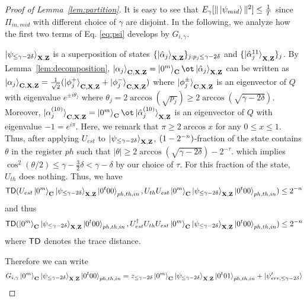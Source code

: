 \begin{proof}[Proof of Lemma~\ref{lem:partition}]
It is easy to see that $E_{\gamma}[\|\ket{\psi_{mid}}\|^2]\leq \frac{1}{T}$ since $\Pi_{in, mid}$ with different choice of $\gamma$ are disjoint. 
In the following, we analyze how the first two terms of Eq. \ref{eq:psi} develops by $G_{i,\gamma}$. 

$\ket{\psi_{\leq\gamma-2\delta}}_{\mathbf{X},\mathbf{Z}}$ is a superposition of states $\{\ket{\hat{\alpha}_j}_{\mathbf{X},\mathbf{Z}}\}_{j:p_j\leq \gamma-2\delta}$ and $\{\ket{\hat{\alpha}_j^{11}}_{\mathbf{X},\mathbf{Z}}\}_{j}$.
By Lemma~\ref{lem:decomposition}, $\ket{\alpha_j}_{\regC,\regX,\regZ}=\ket{0^m}_{\regC}\ot \ket{\hat{\alpha}_j}_{\regX,\regZ}$ can be written as $\ket{\alpha_j}_{\mathbf{C},\mathbf{X},\mathbf{Z}}=\frac{1}{\sqrt{2}}(\ket{\phi_j^+}_{\mathbf{C},\mathbf{X},\mathbf{Z}}+\ket{\phi_j^-}_{\mathbf{C},\mathbf{X},\mathbf{Z}})$ where $\ket{\phi_j^\pm}_{\mathbf{C},\mathbf{X},\mathbf{Z}}$ is an eigenvector of $Q$ with eigenvalue $e^{\pm i\theta_j}$ where $\theta_j=2\arccos(\sqrt{p_j})\geq 2\arccos (\sqrt{\gamma-2\delta})$. 
Moreover,  $\ket{\alpha_j^{(10)}}_{\regC,\regX,\regZ}=\ket{0^m}_{\regC}\ot \ket{\hat{\alpha}_j^{(10)}}_{\regX,\regZ}$ is an eigenvector of $Q$ with eigenvalue $-1=e^{i\pi}$. 
Here, we remark that $\pi\geq 2\arccos x$ for any $0\leq x \leq 1$.
Thus, after applying $U_{est}$ to  $\ket{\psi_{\leq\gamma-2\delta}}_{\mathbf{X},\mathbf{Z}}$, $(1-2^{-n})$-fraction of the state contains $\theta$ in the register $ph$ such that $|\theta|\geq 2\arccos(\sqrt{\gamma-2\delta}) -2^{-\tau}$. which implies $\cos^2(\theta/2)\leq \gamma-\frac{3}{2}\delta<\gamma-\delta$ by our choice of $\tau$.
For this fraction of the state, $U_{th}$ does nothing.
 Thus, we have 
 \begin{align*}
 \mathsf{TD}(U_{est}\ket{0^m}_{\mathbf{C}}\ket{\psi_{\leq\gamma-2\delta}}_{\mathbf{X},\mathbf{Z}}\ket{0^t00}_{ph,th,in},U_{th}U_{est}\ket{0^m}_{\mathbf{C}}\ket{\psi_{\leq\gamma-2\delta}}_{\mathbf{X},\mathbf{Z}}\ket{0^t00}_{ph,th,in})\leq 2^{-n}
 \end{align*}
  and thus
  \begin{align*}
  \mathsf{TD}(\ket{0^m}_{\mathbf{C}}\ket{\psi_{\leq\gamma-2\delta}}_{\mathbf{X},\mathbf{Z}}\ket{0^t00}_{ph,th,in},U_{est}^\dag U_{th}U_{est}\ket{0^m}_{\mathbf{C}}\ket{\psi_{\leq\gamma-2\delta}}_{\mathbf{X},\mathbf{Z}}\ket{0^t00}_{ph,th,in})\leq 2^{-n}
  \end{align*}
   where $\mathsf{TD}$ denotes the trace distance. 

Therefore we can write
\begin{align}
 G_{i,\gamma}\ket{0^m}_{\mathbf{C}}\ket{\psi_{\leq\gamma-2\delta}}_{\mathbf{X},\mathbf{Z}}\ket{0^t00}_{ph,th,in}=z_{\leq \gamma-2\delta}\ket{0^m}_{\mathbf{C}}\ket{\psi_{\leq\gamma-2\delta}}_{\mathbf{X},\mathbf{Z}}\ket{0^t01}_{ph,th,in}+\ket{\psi'_{err,\leq \gamma-2\delta}} \label{eq:leq}
\end{align}


\end{proof}
